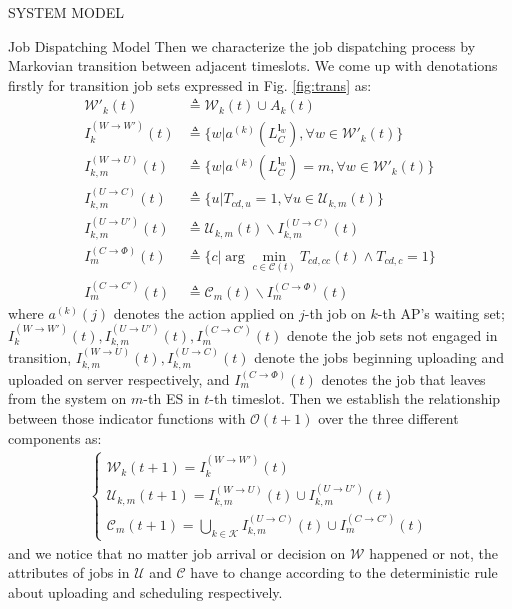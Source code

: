 \documentclass[10pt, conference, letterpaper]{IEEEtran}
\renewcommand{\vec}{\mathbf}
\newcommand{\apSet}{\mathcal{K}}
\newcommand{\wSet}{\mathcal{W}}
\newcommand{\uSet}{\mathcal{U}}
\newcommand{\cSet}{\mathcal{C}}
\begin{document}
\begin{section}{SYSTEM MODEL}
\begin{subsection}{Job Dispatching Model}
            Then we characterize the job dispatching process by Markovian transition between adjacent timeslots.
            We come up with denotations firstly for transition job sets expressed in Fig. \ref{fig:trans} as:
            \begin{align}
                \wSet'_{k}(t) &\triangleq \wSet_{k}(t) \cup A_k(t)
                \\
                I^{(W \to W')}_{k}(t) & \triangleq \{ w | a^{(k)}(L_C^{\vec{l}_w}), \forall w \in \wSet'_{k}(t) \}
                \\
                I^{(W \to U)}_{k,m}(t) &\triangleq \{ w | a^{(k)}(L_C^{\vec{l}_w})=m, \forall w \in \wSet'_{k}(t) \}
                \\
                I^{(U \to C)}_{k,m}(t) &\triangleq \{ u | T_{cd,u}=1, \forall u \in \uSet_{k,m}(t)\}
                \\
                I^{(U \to U')}_{k,m}(t) &\triangleq \uSet_{k,m}(t) \backslash I^{(U \to C)}_{k,m}(t)
                \\
                I^{(C \to \Phi)}_{m}(t) &\triangleq \{ c | \arg\min_{c\in\cSet(t)} T_{cd,cc}(t) \wedge T_{cd,c}=1\}
                \\
                I^{(C \to C')}_{m}(t) &\triangleq \cSet_{m}(t) \backslash I^{(C \to \Phi)}_{m}(t)
            \end{align}
            where $a^{(k)}(j)$ denotes the action applied on $j$-th job on $k$-th AP's waiting set; $I^{(W \to W')}_{k}(t), I^{(U \to U')}_{k,m}(t), I^{(C \to C')}_{m}(t)$ denote the job sets not engaged in transition, $I^{(W \to U)}_{k,m}(t), I^{(U \to C)}_{k,m}(t)$ denote the jobs beginning uploading and uploaded on server respectively, and $I^{(C \to \Phi)}_{m}(t)$ denotes the job that leaves from the system on $m$-th ES in $t$-th timeslot.
            Then we establish the relationship between those indicator functions with $\mathcal{O}(t+1)$ over the three different components as:
            \begin{align}
                \begin{cases}
                    \wSet_{k}(t+1) = I^{(W \to W')}_{k}(t)
                    \\
                    \uSet_{k,m}(t+1) = I^{(W \to U)}_{k,m}(t) \cup I^{(U \to U')}_{k,m}(t)
                    \\
                    \cSet_{m}(t+1) = \bigcup\limits_{k\in\apSet} I^{(U \to C)}_{k,m}(t) \cup I^{(C \to C')}_{m}(t)
                \end{cases}
            \end{align}
            and we notice that no matter job arrival or decision on $\wSet$ happened or not, the attributes of jobs in $\uSet$ and $\cSet$ have to change according to the deterministic rule about uploading and scheduling respectively.


\end{subsection}
\end{section}
\end{document}
